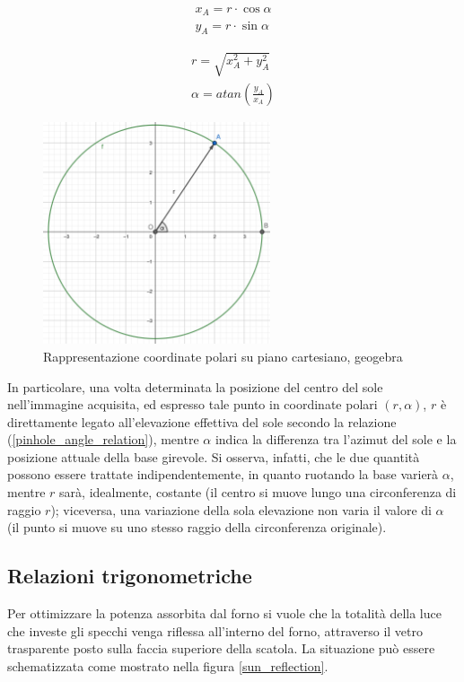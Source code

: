 \documentclass[12pt]{article}
\begin{document}
    \begin{equation}
        \begin{split}
        x_A = r \cdot \cos\alpha \\
        y_A = r \cdot  \sin\alpha
        \end{split}
    \end{equation}
    
    \begin{equation}
        \begin{split}
        r = \sqrt{x_A^2 + y_A^2} \\
        \alpha = atan \left(\frac{y_A}{x_A} \right)
        \end{split}
    \end{equation}
    
    \begin{figure}[h]
    \centering
        \includegraphics[width=190pt]{Draws/geogebra-export_polar_circle.png}
        \caption{Rappresentazione coordinate polari su piano cartesiano, geogebra}
    \end{figure}
    
    In particolare, una volta determinata la posizione del centro del sole nell'immagine acquisita, ed espresso tale punto in coordinate polari $(r, \alpha)$, $r$ è direttamente legato all'elevazione effettiva del sole secondo la relazione (\ref{pinhole_angle_relation}), mentre $\alpha$ indica la differenza tra l'azimut del sole e la posizione attuale della base girevole. Si osserva, infatti, che le due quantità possono essere trattate indipendentemente, in quanto ruotando la base varierà $\alpha$, mentre $r$ sarà, idealmente, costante (il centro si muove lungo una circonferenza di raggio $r$); viceversa, una variazione della sola elevazione non varia il valore di $\alpha$ (il punto si muove su uno stesso raggio della circonferenza originale).
    
    
    \subsection{Relazioni trigonometriche}
    Per ottimizzare la potenza assorbita dal forno si vuole che la totalità della luce che investe gli specchi venga riflessa all'interno del forno, attraverso il vetro trasparente posto sulla faccia superiore della scatola. La situazione può essere schematizzata come mostrato nella figura \ref{sun_reflection}.
\end{document}
